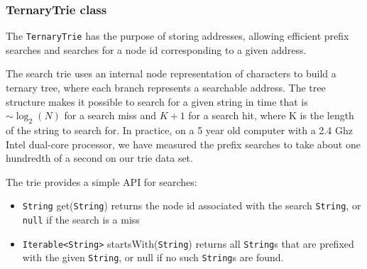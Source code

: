 \subsubsection{TernaryTrie class}
\label{sec:TernaryTrie class}
The \texttt{TernaryTrie} has the purpose of storing addresses, allowing efficient prefix searches and searches for a node id corresponding to a given address.

The search trie uses an internal node representation of characters to build a ternary tree, where each branch represents a searchable address.
The tree structure makes it possible to search for a given string in time that is $\sim\log_2 (N)$ for a search miss and  $K+1$ for a search hit, where K is the length of the string to search for.
In practice, on a 5 year old computer with a 2.4 Ghz Intel dual-core processor, we have measured the prefix searches to take about one hundredth of a second on our trie data set.

The trie  provides a simple API for searches:
\begin{itemize}
	\item \texttt{String} get(\texttt{String}) returns the node id associated with the search \texttt{String}, or \texttt{null} if the search is a miss
	\item \texttt{Iterable<String>} startsWith(\texttt{String}) returns all \texttt{String}s that are prefixed with the given \texttt{String}, or null if no such \texttt{String}s are found.
\end{itemize}
